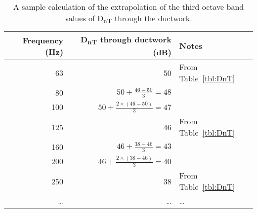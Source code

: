 \begin{table}[htbp]
	\caption{A sample calculation of the extrapolation of the third octave band values of D\textsubscript{nT} through the ductwork.}
	\label{tbl:DnT_extrapolation}
	\centering
	\begin{tabular}{@{}rrl@{}}
		\toprule
		Frequency (Hz) & D\textsubscript{nT} through ductwork (dB) & Notes \\ \midrule
		63 & 50 & From Table~\ref{tbl:DnT} \\
		80 & $50 + \frac{46 - 50}{3} = 48$ &  \\
		100 & $50 + \frac{2 \times (46 - 50)}{3} = 47$ &  \\
		125 & 46 & From Table~\ref{tbl:DnT} \\
		160 & $46 + \frac{38 - 46}{3} = 43$ &  \\
		200 & $46 + \frac{2 \times (38 - 46)}{3} = 40$ &  \\
		250 & 38 & From Table~\ref{tbl:DnT} \\
		\ldots & \ldots & \ldots \\ \bottomrule
	\end{tabular}
\end{table}